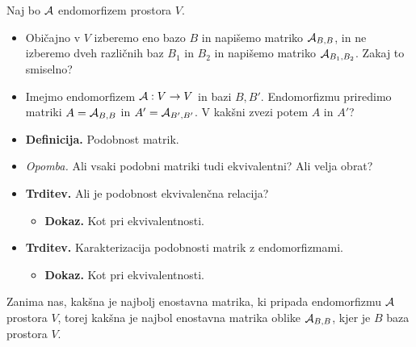 \begin{enumerate}
    Naj bo $\mathcal{A}$ endomorfizem prostora $V$.  
    \begin{itemize}
        \item Običajno v $V$ izberemo eno bazo $B$ in napišemo matriko $\mathcal{A}_{B, B}$, in ne izberemo dveh različnih baz $B_1$ in $B_2$ in napišemo matriko $\mathcal{A}_{B_1, B_2}$. Zakaj to smiselno?
        \item Imejmo endomorfizem $\mathcal{A}: V \to V$ in bazi $B, B'$. Endomorfizmu priredimo matriki $A = \mathcal{A}_{B, B}$ in $A' = \mathcal{A}_{B', B'}$. V kakšni zvezi potem $A$ in $A'$?
        \item \colorbox{purple!30}{\textbf{Definicija.}} Podobnost matrik.
        \item \colorbox{yellow!30}{\emph{Opomba.}} Ali vsaki podobni matriki tudi ekvivalentni? Ali velja obrat?
        \item \colorbox{blue!30}{\textbf{Trditev.}} Ali je podobnost ekvivalenčna relacija?
        \begin{itemize}
            \item \colorbox{green!30}{\textbf{Dokaz.}} Kot pri ekvivalentnosti.
        \end{itemize}
        \item \colorbox{blue!30}{\textbf{Trditev.}} Karakterizacija podobnosti matrik z endomorfizmami.
        \begin{itemize}
            \item \colorbox{green!30}{\textbf{Dokaz.}} Kot pri ekvivalentnosti.
        \end{itemize}
    \end{itemize}
    Zanima nas, kakšna je najbolj enostavna matrika, ki pripada endomorfizmu $\mathcal{A}$ prostora $V$, torej kakšna je najbol enostavna matrika oblike $\mathcal{A}_{B, B}$, kjer je $B$ baza prostora $V$.
\end{enumerate}
